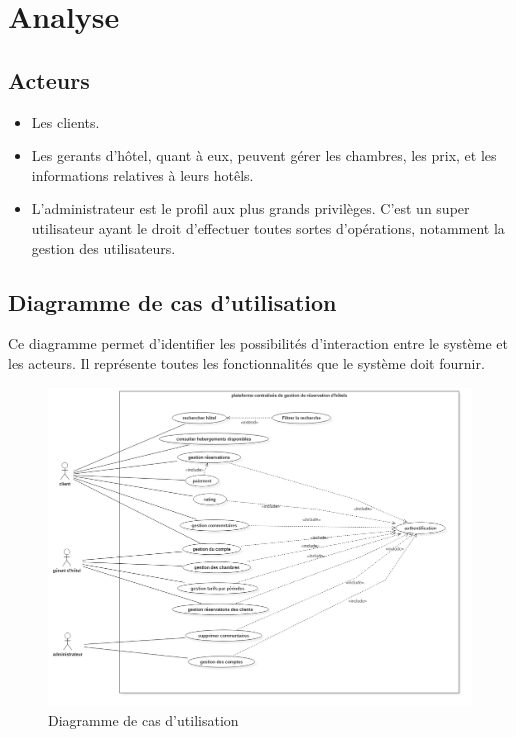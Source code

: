 \documentclass[12pt,a4paper]{report}
\begin{document}
		\section{Analyse}
			\subsection{Acteurs}
			\begin{itemize}
				\item Les clients.
				\item Les gerants d'hôtel, quant à eux, peuvent gérer les chambres, les prix, et les informations relatives à leurs hotêls.
				\item L'administrateur est le profil aux plus grands privilèges. C'est un super utilisateur ayant le droit d'effectuer toutes sortes d'opérations, notamment la gestion des utilisateurs.
			\end{itemize}

			\newpage

			\subsection{Diagramme de cas d'utilisation}
Ce diagramme permet d’identifier les possibilités d’interaction entre le système et les acteurs. Il représente toutes les fonctionnalités que le système doit fournir.


			\begin{figure}[!hbtp]
				\centering
				\includegraphics[scale=0.35]{./graphics/diag_usecase.png}
				\caption{Diagramme de cas d'utilisation}
			\end{figure}
			\newpage
		
\end{document}
